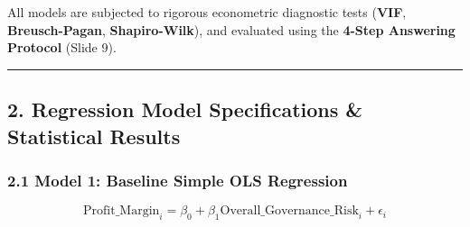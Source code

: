 \documentclass[
]{article}
\begin{document}
All models are subjected to rigorous econometric diagnostic tests
(\textbf{VIF}, \textbf{Breusch-Pagan}, \textbf{Shapiro-Wilk}), and
evaluated using the \textbf{4-Step Answering Protocol} (Slide 9).

\begin{center}\rule{0.5\linewidth}{0.5pt}\end{center}

\subsection{2. Regression Model Specifications \& Statistical
Results}\label{regression-model-specifications-statistical-results}

\subsubsection{2.1 Model 1: Baseline Simple OLS
Regression}\label{model-1-baseline-simple-ols-regression}

\[\text{Profit\_Margin}_i = \beta_0 + \beta_1 \text{Overall\_Governance\_Risk}_i + \epsilon_i\]
\end{document}
